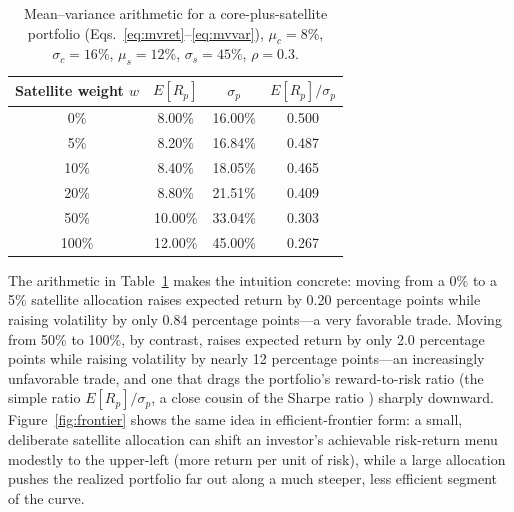 \documentclass[conference]{IEEEtran}
\begin{document}
\begin{table}[!t]
\centering
\caption{Mean--variance arithmetic for a core-plus-satellite portfolio (Eqs.~\ref{eq:mvret}--\ref{eq:mvvar}), $\mu_c=8\%$, $\sigma_c=16\%$, $\mu_s=12\%$, $\sigma_s=45\%$, $\rho=0.3$.}
\label{tab:mvex}
\begin{tabular}{@{}cccc@{}}
\toprule
Satellite weight $w$ & $E[R_p]$ & $\sigma_p$ & $E[R_p]/\sigma_p$ \\
\midrule
0\%   & 8.00\% & 16.00\% & 0.500 \\
5\%   & 8.20\% & 16.84\% & 0.487 \\
10\%  & 8.40\% & 18.05\% & 0.465 \\
20\%  & 8.80\% & 21.51\% & 0.409 \\
50\%  & 10.00\% & 33.04\% & 0.303 \\
100\% & 12.00\% & 45.00\% & 0.267 \\
\bottomrule
\end{tabular}
\end{table}

The arithmetic in Table~\ref{tab:mvex} makes the intuition concrete: moving from a 0\% to a 5\% satellite allocation raises expected return by 0.20 percentage points while raising volatility by only 0.84 percentage points---a very favorable trade. Moving from 50\% to 100\%, by contrast, raises expected return by only 2.0 percentage points while raising volatility by nearly 12 percentage points---an increasingly unfavorable trade, and one that drags the portfolio's reward-to-risk ratio (the simple ratio $E[R_p]/\sigma_p$, a close cousin of the Sharpe ratio \cite{sharpe1964}) sharply downward. Figure~\ref{fig:frontier} shows the same idea in efficient-frontier form: a small, deliberate satellite allocation can shift an investor's achievable risk-return menu modestly to the upper-left (more return per unit of risk), while a large allocation pushes the realized portfolio far out along a much steeper, less efficient segment of the curve.
\end{document}
